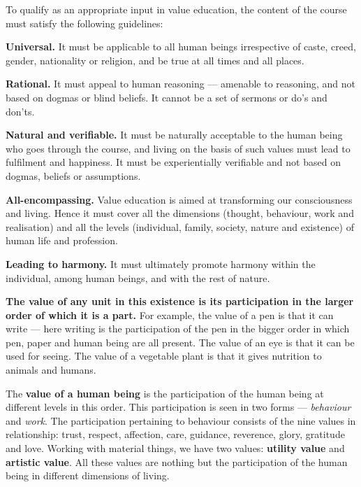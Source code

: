 
\ans To qualify as an appropriate input in value education, the content of the
course must satisfy the following guidelines:

\begin{abul}
\item \textbf{Universal.} It must be applicable to all human beings
      irrespective of caste, creed, gender, nationality or religion, and be
      true at all times and all places.
\item \textbf{Rational.} It must appeal to human reasoning --- amenable to
      reasoning, and not based on dogmas or blind beliefs. It cannot be a set
      of sermons or do's and don'ts.
\item \textbf{Natural and verifiable.} It must be naturally acceptable to the
      human being who goes through the course, and living on the basis of such
      values must lead to fulfilment and happiness. It must be experientially
      verifiable and not based on dogmas, beliefs or assumptions.
\item \textbf{All-encompassing.} Value education is aimed at transforming our
      consciousness and living. Hence it must cover all the dimensions
      (thought, behaviour, work and realisation) and all the levels
      (individual, family, society, nature and existence) of human life and
      profession.
\item \textbf{Leading to harmony.} It must ultimately promote harmony within
      the individual, among human beings, and with the rest of nature.
\end{abul}


\ans \textbf{The value of any unit in this existence is its participation in
the larger order of which it is a part.} For example, the value of a pen is
that it can write --- here writing is the participation of the pen in the
bigger order in which pen, paper and human being are all present. The value of
an eye is that it can be used for seeing. The value of a vegetable plant is
that it gives nutrition to animals and humans.

The \textbf{value of a human being} is the participation of the human being at
different levels in this order. This participation is seen in two forms ---
\emph{behaviour} and \emph{work}. The participation pertaining to behaviour
consists of the nine values in relationship: trust, respect, affection, care,
guidance, reverence, glory, gratitude and love. Working with material things,
we have two values: \textbf{utility value} and \textbf{artistic value}. All
these values are nothing but the participation of the human being in different
dimensions of living.

